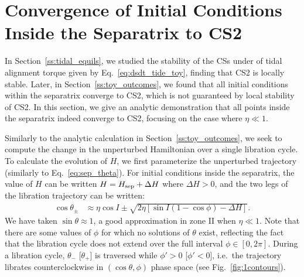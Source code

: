 \documentclass[
        fleqn,
        usenatbib,
        referee,
    ]{mnras}
\newcommand*{\p}[1]{\left(#1\right)}
\newcommand*{\s}[1]{\left[#1\right]}
\begin{document}



\appendix

\onecolumn

\section{Convergence of Initial Conditions Inside the Separatrix to CS2
}\label{app:cs_stab2}

In Section~\ref{ss:tidal_equils}, we studied the stability of the CSs under of
tidal alignment torque given by Eq.~\eqref{eq:dsdt_tide_toy}, finding that CS2
is locally stable. Later, in Section~\ref{ss:toy_outcomes}, we found that all
initial conditions within the separatrix converge to CS2, which is not
guaranteed by local stability of CS2. In this section, we give an analytic
demonstration that all points inside the separatrix indeed converge to CS2,
focusing on the case where $\eta \ll 1$.

Similarly to the analytic calculation in Section~\ref{ss:toy_outcomes}, we seek
to compute the change in the unperturbed Hamiltonian over a single libration
cycle. To calculate the evolution of $H$, we first parameterize the unperturbed
trajectory (similarly to Eq.~\ref{eq:sep_theta}). For initial conditions inside
the separatrix, the value of $H$ can be written $H = H_{\rm sep} + \Delta H$
where $\Delta H > 0$, and the two legs of the libration trajectory can be
written:
\begin{align}
    \cos \theta_{\pm} &\approx
        \eta \cos I \pm \sqrt{2\eta\s{\sin I\p{1 - \cos \phi} - \Delta H}}.
        \label{eq:lib_cycle_toy}
\end{align}
We have taken $\sin \theta \approx 1$, a good approximation in zone II when
$\eta \ll 1$. Note that there are some values of $\phi$ for which no solutions
of $\theta$ exist, reflecting the fact that the libration cycle does not extend
over the full interval $\phi \in [0, 2\pi]$. During a libration cycle,
$\theta_-$ [$\theta_+$] is traversed while $\phi' > 0$ [$\phi' < 0$], i.e.\ the
trajectory librates counterclockwise in $(\cos \theta, \phi)$ phase space (see
Fig.~\ref{fig:1contours}).
\end{document}
